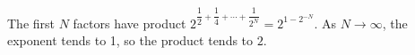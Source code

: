 The first $N$ factors have product $2^{\dfrac{1}{2}+\dfrac{1}{4}+\cdots+\dfrac{1}{2^N}}=2^{1-2^{-N}}$. As $N\to\infty$, the exponent tends to 1, so the product tends to $\boxed2$.

